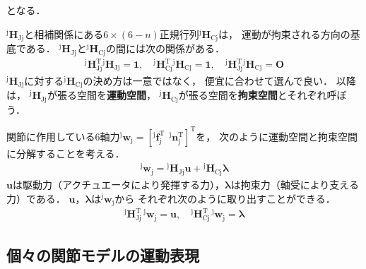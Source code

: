 ﻿\documentclass[a4paper]{jsarticle}
\begin{document}
となる．


${}^{\mathrm{j}}\bm{H}_{\mathrm{Jj}}$と相補関係にある$6\times (6-n)$正規行列${}^{\mathrm{j}}\bm{H}_{\mathrm{Cj}}$は，
運動が拘束される方向の基底である．
${}^{\mathrm{j}}\bm{H}_{\mathrm{Jj}}$と${}^{\mathrm{j}}\bm{H}_{\mathrm{Cj}}$の間には次の関係がある．
\begin{align*}
{}^{\mathrm{j}}\bm{H}_{\mathrm{Jj}}^{\mathrm{T}}{}^{\mathrm{j}}\bm{H}_{\mathrm{Jj}}=\bm{1},\quad
{}^{\mathrm{j}}\bm{H}_{\mathrm{Cj}}^{\mathrm{T}}{}^{\mathrm{j}}\bm{H}_{\mathrm{Cj}}=\bm{1},\quad
{}^{\mathrm{j}}\bm{H}_{\mathrm{Jj}}^{\mathrm{T}}{}^{\mathrm{j}}\bm{H}_{\mathrm{Cj}}=\bm{O}
\end{align*}
${}^{\mathrm{j}}\bm{H}_{\mathrm{Jj}}$に対する${}^{\mathrm{j}}\bm{H}_{\mathrm{Cj}}$の決め方は一意ではなく，
便宜に合わせて選んで良い．
以降は，
${}^{\mathrm{j}}\bm{H}_{\mathrm{Jj}}$が張る空間を{\bf 運動空間}，
${}^{\mathrm{j}}\bm{H}_{\mathrm{Cj}}$が張る空間を{\bf 拘束空間}とそれぞれ呼ぼう．


関節に作用している6軸力${}^{\mathrm{j}}\bm{w}_{\mathrm{j}}=[{}^{\mathrm{j}}\bm{f}_{\mathrm{j}}^{\mathrm{T}}~~{}^{\mathrm{j}}\bm{n}_{\mathrm{j}}^{\mathrm{T}}]^{\mathrm{T}}$を，
次のように運動空間と拘束空間に分解することを考える．
\begin{align*}
{}^{\mathrm{j}}\bm{w}_{\mathrm{j}}={}^{\mathrm{j}}\bm{H}_{\mathrm{Jj}}\bm{u}+{}^{\mathrm{j}}\bm{H}_{\mathrm{Cj}}\bm{\lambda}
\end{align*}
$\bm{u}$は駆動力（アクチュエータにより発揮する力），$\bm{\lambda}$は拘束力（軸受により支える力）である．
$\bm{u}$，$\bm{\lambda}$は${}^{\mathrm{j}}\bm{w}_{\mathrm{j}}$から
それぞれ次のように取り出すことができる．
\begin{align*}
{}^{\mathrm{j}}\bm{H}_{\mathrm{Jj}}^{\mathrm{T}}\,{}^{\mathrm{j}}\bm{w}_{\mathrm{j}}=\bm{u},\quad
{}^{\mathrm{j}}\bm{H}_{\mathrm{Cj}}^{\mathrm{T}}\,{}^{\mathrm{j}}\bm{w}_{\mathrm{j}}=\bm{\lambda}
\end{align*}


\subsection{個々の関節モデルの運動表現}
\end{document}
